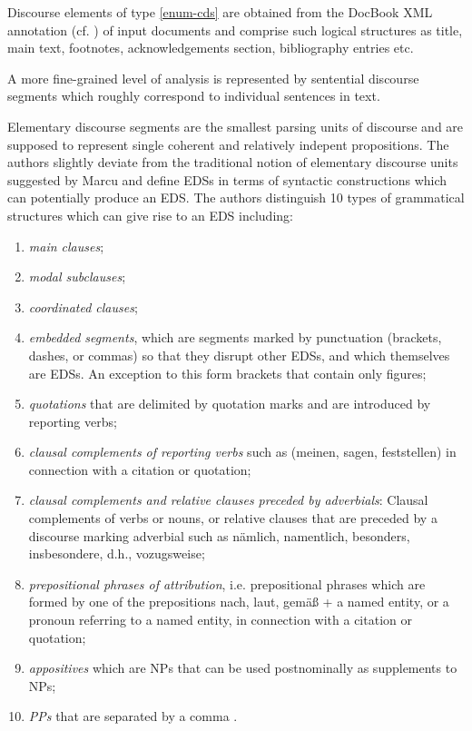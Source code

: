 \documentclass[a4paper,11pt]{article}
\begin{document}
Discourse elements of type \ref{enum-cds} are obtained from the DocBook XML
annotation (cf. \cite{Walsh-99}) of input documents and comprise such logical
structures as title, main text, footnotes, acknowledgements section,
bibliography entries etc.

A more fine-grained level of analysis is represented by sentential discourse
segments which roughly correspond to individual sentences in text.

Elementary discourse segments are the smallest parsing units of
discourse and are supposed to represent single coherent and relatively
indepent propositions.  The authors slightly deviate from the
traditional notion of elementary discourse units suggested by Marcu
\cite{Marcu-99} and define EDSs in terms of syntactic constructions
which can potentially produce an EDS.  The authors distinguish 10
types of grammatical structures which can give rise to an EDS
including:
\begin{enumerate}
  \item \textit{main clauses};
  \item \textit{modal subclauses};
  \item \textit{coordinated clauses};
  \item \textit{embedded segments}, which are segments marked by punctuation
    (brackets, dashes, or commas) so that they disrupt other EDSs, and which
    themselves are EDSs. An exception to this form brackets that contain only
    figures;
  \item \textit{quotations} that are delimited by quotation marks and are
    introduced by reporting verbs;
  \item \textit{clausal complements of reporting verbs} such as (meinen,
    sagen, feststellen) in connection with a citation or quotation;
  \item \textit{clausal complements and relative clauses preceded by
    adverbials}: Clausal complements of verbs or nouns, or relative clauses
    that are preceded by a discourse marking adverbial such as n\"amlich,
    namentlich, besonders, insbesondere, d.h., vozugsweise;
  \item \textit{prepositional phrases of attribution}, i.e. prepositional
    phrases which are formed by one of the prepositions nach, laut, gem\"a\ss
    + a named entity, or a pronoun referring to a named entity, in connection
    with a citation or quotation;
  \item \textit{appositives} which are NPs that can be used postnominally as
    supplements to NPs;
  \item \textit{PPs} that are separated by a comma .
\end{enumerate}
\end{document}
